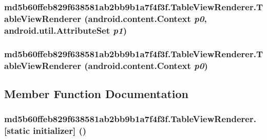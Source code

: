 \hypertarget{classmd5b60ffeb829f638581ab2bb9b1a7f4f3f_1_1_table_view_renderer_993ff43e62fb704b89294265d31986e0}{
\subsubsection[{TableViewRenderer}]{\setlength{\rightskip}{0pt plus 5cm}md5b60ffeb829f638581ab2bb9b1a7f4f3f.TableViewRenderer.TableViewRenderer (android.content.Context {\em p0}, \/  android.util.AttributeSet {\em p1})}}
\label{classmd5b60ffeb829f638581ab2bb9b1a7f4f3f_1_1_table_view_renderer_993ff43e62fb704b89294265d31986e0}


\hypertarget{classmd5b60ffeb829f638581ab2bb9b1a7f4f3f_1_1_table_view_renderer_74f51d5fe59d370780fb4fd9ad0475db}{
\subsubsection[{TableViewRenderer}]{\setlength{\rightskip}{0pt plus 5cm}md5b60ffeb829f638581ab2bb9b1a7f4f3f.TableViewRenderer.TableViewRenderer (android.content.Context {\em p0})}}
\label{classmd5b60ffeb829f638581ab2bb9b1a7f4f3f_1_1_table_view_renderer_74f51d5fe59d370780fb4fd9ad0475db}




\subsection{Member Function Documentation}
\hypertarget{classmd5b60ffeb829f638581ab2bb9b1a7f4f3f_1_1_table_view_renderer_9a8e5ca95f8d81d63f025a408f8d84c0}{
\subsubsection[{[static initializer]}]{\setlength{\rightskip}{0pt plus 5cm}md5b60ffeb829f638581ab2bb9b1a7f4f3f.TableViewRenderer.\mbox{[}static initializer\mbox{]} ()}}
\label{classmd5b60ffeb829f638581ab2bb9b1a7f4f3f_1_1_table_view_renderer_9a8e5ca95f8d81d63f025a408f8d84c0}




